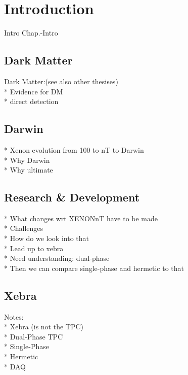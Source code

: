 \chapter{Introduction}
\label{chap:Intro}

Intro Chap.-Intro

\FloatBarrier
\section{Dark Matter}
\label{sec:DarkMatter}
\FloatBarrier

Dark Matter:(see also other thesises) \\
* Evidence for DM \\
* direct detection


\newpage
\FloatBarrier
\section{Darwin}
\label{sec:Darwin}
\FloatBarrier

* Xenon evolution from 100 to nT to Darwin \\
* Why Darwin \\
* Why ultimate


\newpage
\FloatBarrier
\section{Research \& Development}
\label{sec:RnD}
\FloatBarrier

* What changes wrt XENONnT have to be made \\
* Challenges \\
* How do we look into that \\
* Lead up to xebra \\
* Need understanding: dual-phase \\
* Then we can compare single-phase and hermetic to that


\newpage
\FloatBarrier
\section{Xebra}
\label{sec:Xebra}
\FloatBarrier

Notes: \\
* Xebra (is not the TPC) \\
* Dual-Phase TPC \\
* Single-Phase \\
* Hermetic \\
* DAQ

